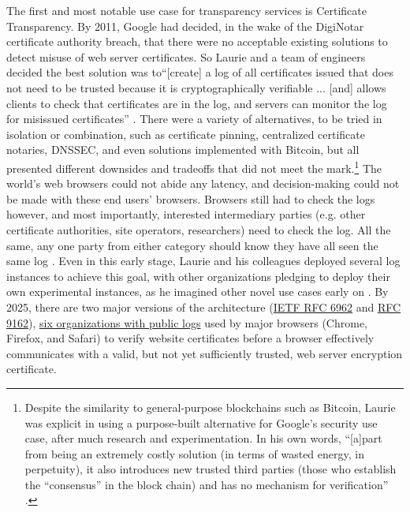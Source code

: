\documentclass{jdf}
\begin{document}
The first and most notable use case for transparency services is Certificate Transparency. By 2011, Google had decided, in the wake of the DigiNotar certificate authority breach, that there were no acceptable existing solutions to detect misuse of web server certificates. So Laurie and a team of engineers decided the best solution was to``[create] a log of all certificates issued that does not need to be trusted because it is cryptographically verifiable ... [and] allows clients to check that certificates are in the log, and servers can monitor the log for misissued certificates'' \citeyear[p.~4]{laurie14}. There were a variety of alternatives, to be tried in isolation or combination, such as certificate pinning, centralized certificate notaries, DNSSEC, and even solutions implemented with Bitcoin, but all presented different downsides and tradeoffs that did not meet the mark.\footnote{Despite the similarity to general-purpose blockchains such as Bitcoin, Laurie was explicit in using a purpose-built alternative for Google's security use case, after much research and experimentation. In his own words, ``[a]part from being an extremely costly solution (in terms of wasted energy, in perpetuity), it also introduces new trusted third parties (those who establish the “consensus” in the block chain) and has no mechanism for verification'' \citeyear[p.~4]{laurie14}.} The world's web browsers could not abide any latency, and decision-making could not be made with these end users' browsers. Browsers still had to check the logs however, and most importantly, interested intermediary parties (e.g. other certificate authorities, site operators, researchers) need to check the log. All the same, any one party from either category should know they have all seen the same log \cite[p.~7]{laurie14}. Even in this early stage, Laurie and his colleagues deployed several log instances to achieve this goal, with other organizations pledging to deploy their own experimental instances, as he imagined other novel use cases early on \citeyear[pp.~809]{laurie14}. By 2025, there are two major versions of the architecture (\href{https://datatracker.ietf.org/doc/html/rfc6962}{IETF RFC 6962} and \href{https://datatracker.ietf.org/doc/html/rfc9162}{RFC 9162}), \href{https://certificate.transparency.dev/logs/}{six organizations with public logs} used by major browsers (Chrome, Firefox, and Safari) to verify website certificates before a browser effectively communicates with a valid, but not yet sufficiently trusted, web server encryption certificate.
\end{document}
